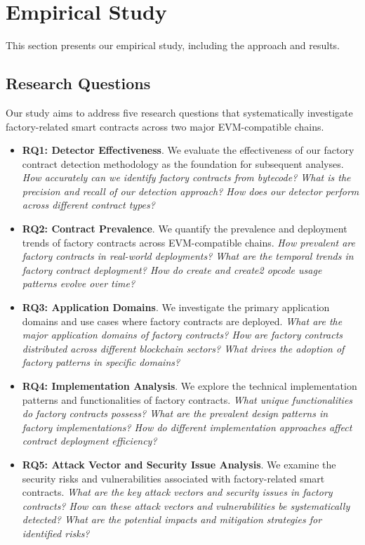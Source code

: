 \documentclass[acmsmall, screen]{acmart}
\begin{document}
	\section{Empirical Study}
	\label{sec:methodology} This section presents our empirical study, including the approach and
	results.

	\subsection{Research Questions}
	Our study aims to address five research questions that systematically investigate factory-related
	smart contracts across two major EVM-compatible chains.

	\begin{itemize}[leftmargin=0.4cm,topsep=0.1cm]
		\item \textbf{RQ1: Detector Effectiveness}. We evaluate the effectiveness of our factory contract
		detection methodology as the foundation for subsequent analyses. \textit{How accurately
		can we identify factory contracts from bytecode? What is the precision and recall of our
		detection approach? How does our detector perform across different contract types?}

		\item \textbf{RQ2: Contract Prevalence}. We quantify the prevalence and deployment trends of
		factory contracts across EVM-compatible chains. \textit{How prevalent are factory
		contracts in real-world deployments? What are the temporal trends in factory contract deployment?
		How do create and create2 opcode usage patterns evolve over time?}

		\item \textbf{RQ3: Application Domains}. We investigate the primary application domains and use
		cases where factory contracts are deployed. \textit{What are the major application
		domains of factory contracts? How are factory contracts distributed across different blockchain
		sectors? What drives the adoption of factory patterns in specific domains?}

		\item \textbf{RQ4: Implementation Analysis}. We explore the technical implementation patterns
		and functionalities of factory contracts. \textit{What unique functionalities do factory
		contracts possess? What are the prevalent design patterns in factory implementations?
		How do different implementation approaches affect contract deployment efficiency?}

		\item \textbf{RQ5: Attack Vector and Security Issue Analysis}. We examine the security risks
		and vulnerabilities associated with factory-related smart contracts. \textit{What are
		the key attack vectors and security issues in factory contracts? How can these attack vectors
		and vulnerabilities be systematically detected? What are the potential impacts and
		mitigation strategies for identified risks?}
	\end{itemize}
\end{document}
